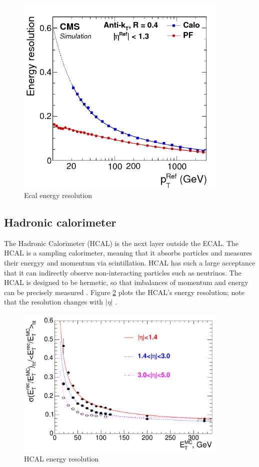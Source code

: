 \begin{figure}[h!]
\begin{centering}
\includegraphics[width=4in]{Chapter3/importfigs/Figure_013-a.png}
\par\end{centering}
\caption{Ecal energy resolution \cite{Bayatian:2006nff}\label{fig:ecalResL1}}
\end{figure}
 
 
\subsection{Hadronic calorimeter}

The Hadronic Calorimeter (HCAL) is the next layer outside the ECAL. The HCAL is a sampling calorimeter, meaning that it absorbs particles and measures their energyy and momentum via scintillation. HCAL has such a large acceptance that it can indirectly observe non-interacting particles such as neutrinos. The HCAL is designed to be hermetic, so that imbalances of momentum and energy can be precisely measured \cite{Baiatian:2007xva}. Figure \ref{fig:hcalRes} plots the HCAL's energy resolution; note that the resolution changes with $|\eta|$ \cite{Bayatian:2006nff}.

\begin{figure}[h!]
\begin{centering}
\includegraphics[width=4in]{Chapter3/importfigs/Figure_001-008.pdf}
\par\end{centering}
\caption{HCAL energy resolution \cite{Bayatian:2006nff}\label{fig:hcalRes}}
\end{figure}

